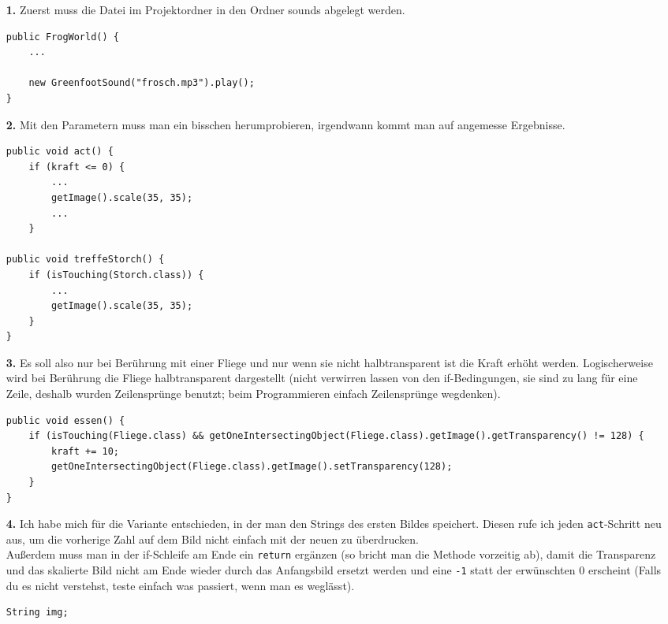 \documentclass{scrartcl}   %
\begin{document}
\begin{itemize}
    \item[\textbf{1.}] Zuerst muss die Datei im Projektordner in den Ordner \glqq sounds\grqq{} abgelegt werden.\\
    \begin{lstlisting}
public FrogWorld() {    
    ...
    
    new GreenfootSound("frosch.mp3").play();
}
    \end{lstlisting}
    \item[\textbf{2.}] Mit den Parametern muss man ein bisschen herumprobieren, irgendwann kommt man auf angemesse Ergebnisse.\\
    \begin{lstlisting}
public void act() {
    if (kraft <= 0) {
        ...
        getImage().scale(35, 35);
        ...
    }

public void treffeStorch() {
    if (isTouching(Storch.class)) {
        ...
        getImage().scale(35, 35);
    }
}
    \end{lstlisting}
    \item[\textbf{3.}] Es soll also nur bei Berührung mit einer Fliege und nur wenn sie nicht halbtransparent ist die Kraft erhöht werden. Logischerweise wird bei Berührung die Fliege halbtransparent dargestellt (nicht verwirren lassen von den if-Bedingungen, sie sind zu lang für eine Zeile, deshalb wurden Zeilensprünge benutzt; beim Programmieren einfach Zeilensprünge wegdenken).
    
    \newpage
    
    \begin{lstlisting}
public void essen() {
    if (isTouching(Fliege.class) && getOneIntersectingObject(Fliege.class).getImage().getTransparency() != 128) {
        kraft += 10;
        getOneIntersectingObject(Fliege.class).getImage().setTransparency(128);
    }
}
    \end{lstlisting}
    \item[\textbf{4.}] Ich habe mich für die Variante entschieden, in der man den Strings des ersten Bildes speichert. Diesen rufe ich jeden \texttt{act}-Schritt neu aus, um die vorherige Zahl auf dem Bild nicht einfach mit der neuen zu \glqq überdrucken\grqq{}.\\
    Außerdem muss man in der if-Schleife am Ende ein \texttt{return} ergänzen (so bricht man die Methode vorzeitig ab), damit die Transparenz und das skalierte Bild nicht am Ende wieder durch das Anfangsbild ersetzt werden und eine \texttt{-1} statt der erwünschten 0 erscheint (Falls du es nicht verstehst, teste einfach was passiert, wenn man es weglässt).\\
    \begin{lstlisting}
String img;


\end{lstlisting}
\end{itemize}
\end{document}
